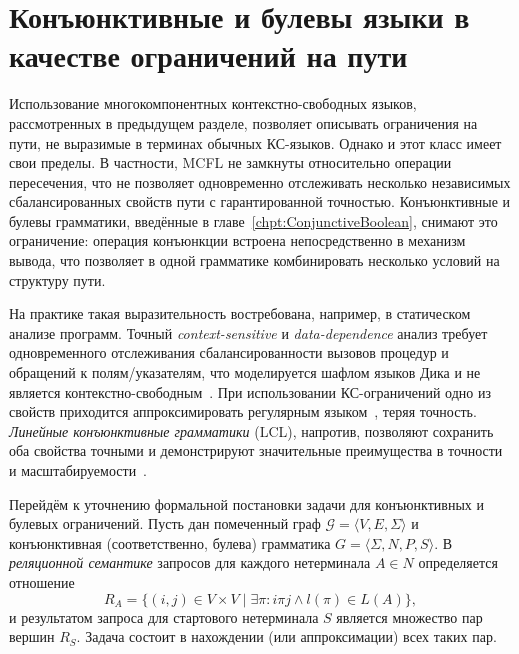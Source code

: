 \section{Конъюнктивные и булевы языки в качестве ограничений на пути}
\label{sec:FLPQ_ConjunctiveBooleanConstraints}


Использование многокомпонентных контекстно-свободных языков, рассмотренных в предыдущем разделе, позволяет описывать ограничения на пути, не выразимые в терминах обычных КС-языков.
Однако и этот класс имеет свои пределы.
В частности, MCFL не замкнуты относительно операции пересечения, что не позволяет одновременно отслеживать несколько независимых сбалансированных свойств пути с гарантированной точностью.
Конъюнктивные и булевы грамматики, введённые в главе~\ref{chpt:ConjunctiveBoolean}, снимают это ограничение: операция конъюнкции встроена непосредственно в механизм вывода, что позволяет в одной грамматике комбинировать несколько условий на структуру пути.

На практике такая выразительность востребована, например, в статическом анализе программ.
Точный \emph{context-sensitive} и \emph{data-dependence} анализ требует одновременного отслеживания сбалансированности вызовов процедур и обращений к полям/указателям, что моделируется шафлом языков Дика и не является контекстно-свободным~.
При использовании КС-ограничений одно из свойств приходится аппроксимировать регулярным языком~, теряя точность.
\emph{Линейные конъюнктивные грамматики} (LCL), напротив, позволяют сохранить оба свойства точными и демонстрируют значительные преимущества в точности и масштабируемости~.

Перейдём к уточнению формальной постановки задачи для конъюнктивных и булевых ограничений.
Пусть дан помеченный граф $\mathcal{G} = \langle V, E, \Sigma \rangle$ и конъюнктивная (соответственно, булева) грамматика $G = \langle \Sigma, N, P, S \rangle$.
В \emph{реляционной семантике} запросов для каждого нетерминала $A \in N$ определяется отношение
\[
    R_A = \{(i,j) \in V \times V \mid \exists \pi: i \pi j \land l(\pi) \in L(A)\},
\]
и результатом запроса для стартового нетерминала $S$ является множество пар вершин $R_S$.
Задача состоит в нахождении (или аппроксимации) всех таких пар.

